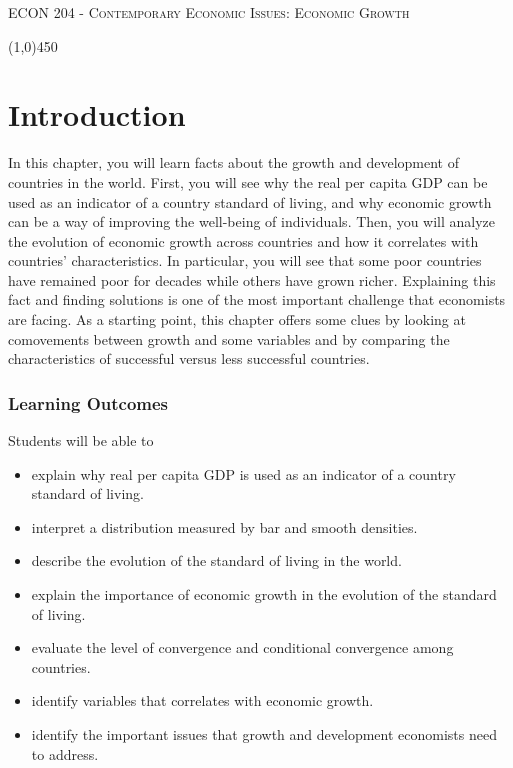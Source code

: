 \documentclass[letterpaper]{article}\usepackage[]{graphicx}\usepackage[]{color}
\numberwithin{exer}{section}
\theoremstyle{nonumberplain}
\begin{document}
\noindent
 \textsc{\Large ECON 204 - Contemporary Economic Issues: Economic Growth}\\[.1cm]
 \begin{center}
   \line(1,0){450}\\[0.2cm]
   \end{center}



\tableofcontents

\section{Introduction}\label{sec:intro}

In this chapter, you will learn facts about the growth and development
of countries in the world. First, you will see why the real per capita
GDP can be used as an indicator of a country standard of living, and
why economic growth can be a way of improving the well-being of
individuals. Then, you will analyze the evolution of economic growth
across countries and how it correlates with countries'
characteristics. In particular, you will see that some poor countries
have remained poor for decades while others have grown
richer. Explaining this fact and finding solutions is one of the most
important challenge that economists are facing. As a starting point,
this chapter offers some clues by looking at comovements between growth
and some variables and by comparing the characteristics of successful
versus less successful countries.



\subsubsection*{Learning Outcomes}
Students will be able to

\begin{itemize}
\item explain why real per capita GDP is used as an indicator of a
  country standard of living.
\item interpret a distribution measured by bar and smooth densities.
\item describe the evolution of the standard of living in the world.
\item explain the importance of economic growth in the evolution of
  the standard of living.
\item evaluate the level of convergence and conditional convergence
  among countries.
\item identify variables that correlates with economic growth.  
\item identify the important issues that growth and development
  economists need to address.
\end{itemize}
\end{document}
